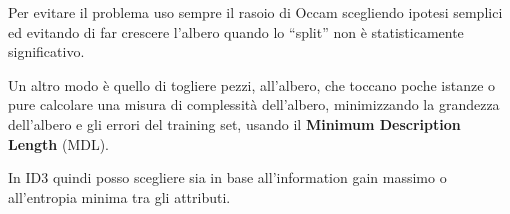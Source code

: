 Per evitare il problema uso sempre il rasoio di Occam scegliendo ipotesi semplici
ed evitando di far crescere l'albero quando lo “split” non è statisticamente significativo.

Un altro modo è quello di togliere pezzi, all'albero, che toccano poche istanze
o pure calcolare una misura di complessità dell'albero, minimizzando la grandezza
dell'albero e gli errori del training set, usando il \textbf{Minimum Description Length} (MDL).

In ID3 quindi posso scegliere sia in base all'information gain massimo o
all'entropia minima tra gli attributi.